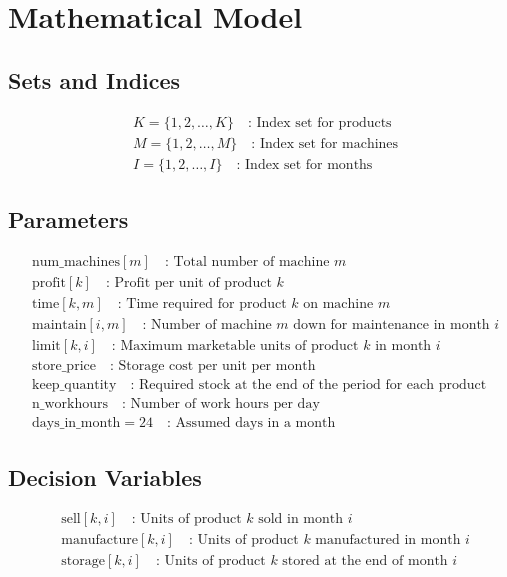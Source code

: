 \documentclass{article}
\begin{document}
\section*{Mathematical Model}

\subsection*{Sets and Indices}
\begin{align*}
  & K = \{1, 2, \ldots, K\} \quad \text{: Index set for products} \\
  & M = \{1, 2, \ldots, M\} \quad \text{: Index set for machines} \\
  & I = \{1, 2, \ldots, I\} \quad \text{: Index set for months}
\end{align*}

\subsection*{Parameters}
\begin{align*}
  & \text{num\_machines}[m] \quad \text{: Total number of machine $m$}\\
  & \text{profit}[k] \quad \text{: Profit per unit of product $k$} \\
  & \text{time}[k, m] \quad \text{: Time required for product $k$ on machine $m$} \\
  & \text{maintain}[i, m] \quad \text{: Number of machine $m$ down for maintenance in month $i$} \\
  & \text{limit}[k, i] \quad \text{: Maximum marketable units of product $k$ in month $i$} \\
  & \text{store\_price} \quad \text{: Storage cost per unit per month} \\
  & \text{keep\_quantity} \quad \text{: Required stock at the end of the period for each product} \\
  & \text{n\_workhours} \quad \text{: Number of work hours per day} \\
  & \text{days\_in\_month} = 24 \quad \text{: Assumed days in a month}
\end{align*}

\subsection*{Decision Variables}
\begin{align*}
  & \text{sell}[k, i] \quad \text{: Units of product $k$ sold in month $i$} \\
  & \text{manufacture}[k, i] \quad \text{: Units of product $k$ manufactured in month $i$} \\
  & \text{storage}[k, i] \quad \text{: Units of product $k$ stored at the end of month $i$}
\end{align*}
\end{document}
